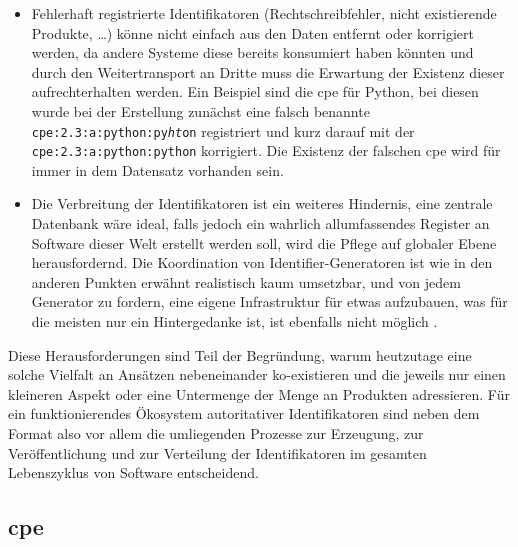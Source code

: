 \begin{itemize}
    \item Fehlerhaft registrierte Identifikatoren (Rechtschreibfehler, nicht existierende Produkte, \ldots) könne nicht einfach aus den Daten entfernt oder korrigiert werden, da andere Systeme diese bereits konsumiert haben könnten und durch den Weitertransport an Dritte muss die Erwartung der Existenz dieser aufrechterhalten werden.
    Ein Beispiel sind die \acrshort{cpe} für Python, bei diesen wurde bei der Erstellung zunächst eine falsch benannte \texttt{cpe:2.3:a:python:py\textit{ht}on} registriert und kurz darauf mit der \texttt{cpe:2.3:a:python:python} korrigiert.
    Die Existenz der falschen \acrshort{cpe} wird für immer in dem Datensatz vorhanden sein.

    \item Die Verbreitung der Identifikatoren ist ein weiteres Hindernis, eine zentrale Datenbank wäre ideal, falls jedoch ein wahrlich allumfassendes Register an Software dieser Welt erstellt werden soll, wird die Pflege auf globaler Ebene herausfordernd.
    Die Koordination von Identifier-Generatoren ist wie in den anderen Punkten erwähnt realistisch kaum umsetzbar, und von jedem Generator zu fordern, eine eigene Infrastruktur für etwas aufzubauen, was für die meisten nur ein Hintergedanke ist, ist ebenfalls nicht möglich \autocite{CISA2023}.
\end{itemize}

Diese Herausforderungen sind Teil der Begründung, warum heutzutage eine solche Vielfalt an Ansätzen nebeneinander ko-existieren und die jeweils nur einen kleineren Aspekt oder eine Untermenge der Menge an Produkten adressieren.
Für ein funktionierendes Ökosystem autoritativer Identifikatoren sind neben dem Format also vor allem die umliegenden Prozesse zur Erzeugung, zur Veröffentlichung und zur Verteilung der Identifikatoren im gesamten Lebenszyklus von Software entscheidend.

\subsection{\acrfull{cpe}}\label{subsec:cpe-description}


